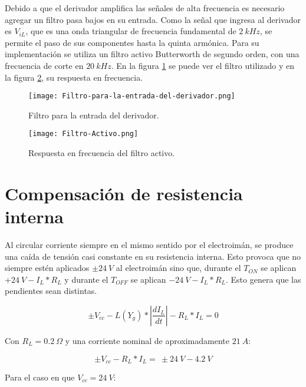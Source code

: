 Debido a que el derivador amplifica las señales de alta frecuencia es necesario agregar un filtro pasa bajos en su entrada. Como la señal que ingresa al derivador es $V_{iL}$, que es una onda triangular de frecuencia fundamental de $2\:kHz$, se permite el paso de sus componentes hasta la quinta armónica. Para su implementación se utiliza un filtro activo Butterworth de segundo orden, con una frecuencia de corte en $20\:kHz$. En la figura  \ref{fig:img_Filtro-para-la-entrada-del-derivador} se puede ver el filtro utilizado y en la figura \ref{fig:img_Respuesta-en-frecuencia-del-filtro-activo}, su respuesta en frecuencia.

\begin{figure}[H]
	\centering
	\texttt{[image: Filtro-para-la-entrada-del-derivador.png]}
	\caption{Filtro para la entrada del derivador.}
	\label{fig:img_Filtro-para-la-entrada-del-derivador}
\end{figure}

\begin{figure}[H]
	\centering
	\texttt{[image: Filtro-Activo.png]}
	\caption{Respuesta en frecuencia del filtro activo.}
	\label{fig:img_Respuesta-en-frecuencia-del-filtro-activo}
\end{figure}

\section{Compensación de resistencia interna}

Al circular corriente siempre en el mismo sentido por el electroimán, se produce una caída de tensión casi constante en su resistencia interna. Esto provoca que no siempre estén aplicados $\pm 24\:V$ al electroimán sino que, durante el $T_{ON}$ se aplican $+24\:V-I_L*R_L$ y durante el $T_{OFF}$ se aplican $-24\:V-I_L*R_L$. Esto genera que las pendientes sean distintas.

\begin{equation} \label{eq_Vbus-didt-RL}
	\pm V_{cc}-L(Y_g)*\left|\frac{{dI}_L}{dt}\right|-R_L*I_L=0
\end{equation}

Con  $R_L=0.2 \:\Omega$ y una corriente nominal  de aproximadamente $21\:A$:

\begin{equation} \label{eq_Vbus-didt-RL-2}
	\pm V_{cc}-R_L*I_L=\ \pm 24\:V-4.2\:V
\end{equation}

Para el caso en que $V_{cc}=24\:V$:

